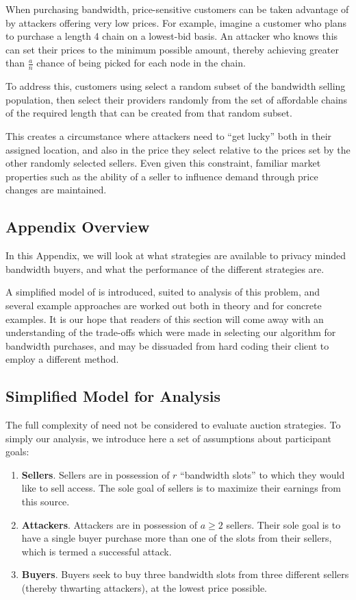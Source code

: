 When purchasing bandwidth, price-sensitive customers can be taken
advantage of by attackers offering very low prices. For example,
imagine a customer who plans to purchase a length 4 chain on a
lowest-bid basis. An attacker who knows this can set their prices to
the minimum possible amount, thereby achieving greater than
$\frac{a}{n}$ chance of being picked for each node in the chain.

To address this, customers using \tOM{} select a random subset of the
bandwidth selling population, then select their providers randomly
from the set of affordable chains of the required length that can be
created from that random subset.

This creates a circumstance where attackers need to ``get lucky'' both
in their assigned location, and also in the price they select relative
to the prices set by the other randomly selected sellers. Even given
this constraint, familiar market properties such as the ability of a
seller to influence demand through price changes are maintained.

\subsection{Appendix Overview}

In this Appendix, we will look at what strategies are available to
privacy minded bandwidth buyers, and what the performance of the
different strategies are.

A simplified model of \tOM{} is introduced, suited to analysis of this
problem, and several example approaches are worked out both in theory
and for concrete examples. It is our hope that readers of this section
will come away with an understanding of the trade-offs which were made
in selecting our algorithm for bandwidth purchases, and may be
dissuaded from hard coding their client to employ a different method.

\subsection{Simplified Model for Analysis}

The full complexity of \tOM{} need not be considered to evaluate
auction strategies. To simply our analysis, we introduce here a set of
assumptions about participant goals:

\begin{enumerate}
\item \textbf{Sellers}. Sellers are in possession of $r$ ``bandwidth
  slots'' to which they would like to sell access. The sole goal of
  sellers is to maximize their earnings from this source.
\item \textbf{Attackers}. Attackers are in possession of $a \geq 2$
  sellers. Their sole goal is to have a single buyer purchase more
  than one of the slots from their sellers, which is termed a
  successful attack.
\item \textbf{Buyers}. Buyers seek to buy three bandwidth slots from
  three different sellers (thereby thwarting attackers), at the lowest
  price possible.
\end{enumerate}

